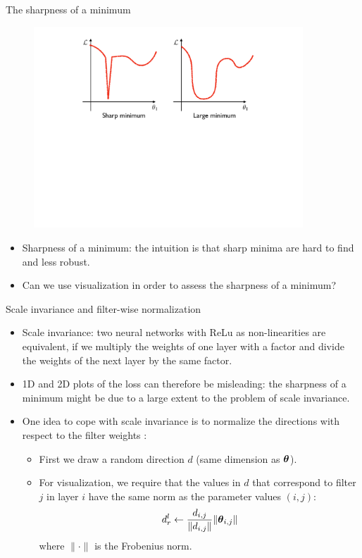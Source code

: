 \documentclass[xcolor=pdftex,dvipsnames,table]{beamer}
\begin{document}
\begin{frame}{The sharpness of a minimum}
\begin{figure}[htb]
\includegraphics[width=0.9\textwidth]{../graphics/Vis_sharpness.pdf}
\end{figure}
\begin{itemize}
	\item Sharpness of a minimum: the intuition is that sharp minima are hard to find and less robust. 
	\item Can we use visualization in order to assess the sharpness of a minimum? 
\end{itemize}
\end{frame}

\begin{frame}{Scale invariance and filter-wise normalization}
\begin{itemize}
	\item Scale invariance: two neural networks with ReLu as non-linearities are equivalent, if we multiply the weights of one layer with a factor and divide the weights of the next layer by the same factor. 
	\item 1D and 2D plots of the loss can therefore be misleading: the sharpness of a minimum might be due to a large extent to the problem of scale invariance. 
	\item One idea to cope with scale invariance is to normalize the directions with respect to the filter weights \cite{Li:2018}:
	\begin{itemize}
		\item First we draw a random direction $d$ (same dimension as $\boldsymbol{\theta}$). 
		\item For visualization, we require that the values in $d$ that correspond to filter $j$ in layer $i$ have the same norm as the parameter values $(i,j)$:
		\begin{equation}
			d^l_r \leftarrow \frac{d_{i,j}}{\|d_{i,j}\|}\|\boldsymbol{\theta}_{i,j}\|
		\end{equation}
		where $\|\cdot\|$ is the Frobenius norm. 
	\end{itemize}
\end{itemize}
\end{frame}
\end{document}
